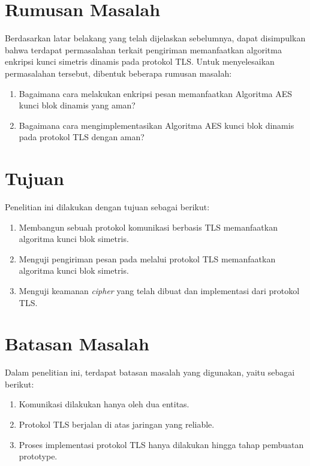 \section{Rumusan Masalah}
Berdasarkan latar belakang yang telah dijelaskan sebelumnya, dapat disimpulkan bahwa terdapat permasalahan terkait pengiriman memanfaatkan algoritma enkripsi kunci simetris dinamis pada protokol TLS. Untuk menyelesaikan permasalahan tersebut, dibentuk beberapa rumusan masalah:
\begin{enumerate}
  \item Bagaimana cara melakukan enkripsi pesan memanfaatkan Algoritma AES kunci blok dinamis yang aman?
  \item Bagaimana cara mengimplementasikan Algoritma AES kunci blok dinamis pada protokol TLS dengan aman?
\end{enumerate}

\section{Tujuan}
Penelitian ini dilakukan dengan tujuan sebagai berikut:

\begin{enumerate}
  \item Membangun sebuah protokol komunikasi berbasis TLS memanfaatkan algoritma kunci blok simetris.
  \item Menguji pengiriman pesan pada melalui protokol TLS memanfaatkan algoritma kunci blok simetris.
  \item Menguji keamanan \emph{cipher} yang telah dibuat dan implementasi dari protokol TLS.
\end{enumerate}

\section{Batasan Masalah}
Dalam penelitian ini, terdapat batasan masalah yang digunakan, yaitu sebagai berikut:
\begin{enumerate}
  \item Komunikasi dilakukan hanya oleh dua entitas.
  \item Protokol TLS berjalan di atas jaringan yang reliable.
  \item Proses implementasi protokol TLS hanya dilakukan hingga tahap pembuatan prototype.
\end{enumerate}

